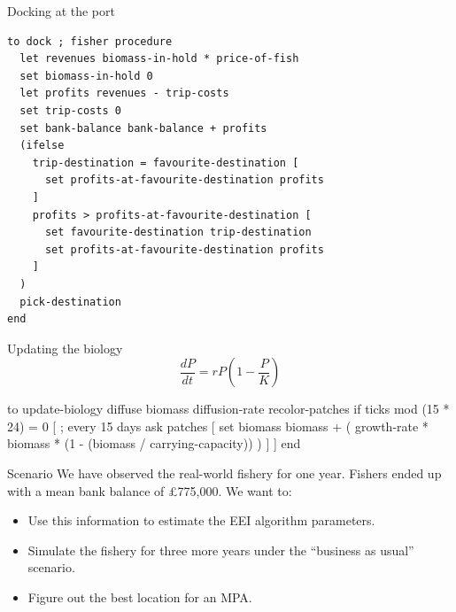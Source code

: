 \documentclass[table, 14pt, aspectratio=169]{beamer}
\begin{document}
\begin{frame}[fragile=singleslide]{Docking at the port}
  \begin{adjustbox}{max height=0.8\textheight, max width = \linewidth}
    \begin{verbatim}
to dock ; fisher procedure
  let revenues biomass-in-hold * price-of-fish
  set biomass-in-hold 0
  let profits revenues - trip-costs
  set trip-costs 0
  set bank-balance bank-balance + profits
  (ifelse
    trip-destination = favourite-destination [
      set profits-at-favourite-destination profits
    ]
    profits > profits-at-favourite-destination [
      set favourite-destination trip-destination
      set profits-at-favourite-destination profits
    ]
  )
  pick-destination
end
    \end{verbatim}
  \end{adjustbox}
\end{frame}


\begin{frame}[fragile=singleslide]{Updating the biology}
  \vfill
  $$\frac{dP}{dt}=r P \left(1 - \frac{P}{K}\right)$$
  \vfill
  \begin{adjustbox}{max width=\linewidth}
    \begin{nlogo}
to update-biology
  diffuse biomass diffusion-rate
  recolor-patches
  if ticks mod (15 * 24) = 0 [ ; every 15 days
    ask patches [
      set biomass biomass + (
        growth-rate * biomass * (1 - (biomass / carrying-capacity))
      )
    ]
  ]
end
    \end{nlogo}
  \end{adjustbox}
\end{frame}

\begin{frame}{Scenario}
  \vfill
  We have observed the real-world fishery for one year.
  \vfill
  Fishers ended up with a mean bank balance of £775,000.
  \vfill
  We want to:
  \vfill
  \begin{itemize}
    \item Use this information to estimate the EEI algorithm parameters.
    \vfill
    \item Simulate the fishery for three more years under the ``business as usual'' scenario.
    \vfill
    \item Figure out the best location for an MPA.
  \end{itemize}
  \vfill
\end{frame}
\end{document}
